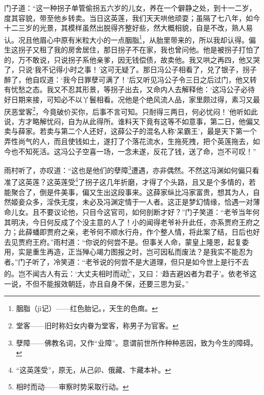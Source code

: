 \par 门子道：“这一种拐子单管偷拐五六岁的儿女，养在一个僻静之处，到十一二岁，度其容貌，带至他乡转卖。当日这英莲，我们天天哄他顽耍；虽隔了七八年，如今十二三岁的光景，其模样虽然出脱得齐整好些，然大概相貌，自是不改，熟人易认。况且他眉心中原有米粒大小的一点胭脂\footnote{胭脂（jì记）——红色胎记。，天生的色癍。}，从胎里带来的，所以我却认得。偏生这拐子又租了我的房舍居住，那日拐子不在家，我也曾问他。他是被拐子打怕了的，万不敢说，只说拐子系他亲爹，因无钱偿债，故卖他。我又哄之再四，他又哭了，只说‘我不记得小时之事！’这可无疑了。那日冯公子相看了，兑了银子，拐子醉了，他自叹道：‘我今日罪孽可满了！’后又听见冯公子令三日之后过门，他又转有忧愁之态。我又不忍其形景，等拐子出去，又命内人去解释他：‘这冯公子必待好日期来接，可知必不以丫鬟相看。况他是个绝风流人品，家里颇过得，素习又最厌恶堂客\footnote{堂客——旧时称妇女内眷为堂客，称男子为官客。}，今竟破价买你，后事不言可知。只耐得三两日，何必忧闷！’他听如此说，方才略解忧闷，自为从此得所。谁料天下竟有这等不如意事，第二日，他偏又卖与薛家。若卖与第二个人还好，这薛公子的混名人称‘呆霸王’，最是天下第一个弄性尚气的人，而且使钱如土，遂打了个落花流水，生拖死拽，把个英莲拖去，如今也不知死活。这冯公子空喜一场，一念未遂，反花了钱，送了命，岂不可叹！”
\par 雨村听了，亦叹道：“这也是他们的孽障\footnote{孽障——佛教名词，又作“业障”。意谓前世所作种种恶因，致为今生的障碍。}遭遇，亦非偶然。不然这冯渊如何偏只看准了这英莲？这英莲受\footnote{“这英莲受”，原无，从己卯、俄藏、卞藏本补。}了拐子这几年折磨，才得了个头路，且又是个多情的，若能聚合了，倒是件美事，偏又生出这段事来。这薛家纵比冯家富贵，想其为人，自然姬妾众多，淫佚无度，未必及冯渊定情于一人者。这正是梦幻情缘，恰遇一对薄命儿女。且不要议论他，只目今这官司，如何剖断才好？”门子笑道：“老爷当年何其明决，今日何反成了个没主意的人了！小的闻得老爷补升此任，亦系贾府王府之力；此薛蟠即贾府之亲，老爷何不顺水行舟，作个整人情，将此案了结，日后也好去见贾府王府。”雨村道：“你说的何尝不是。但事关人命，蒙皇上隆恩，起复委用，实是重生再造，正当殚心竭力图报之时，岂可因私而废法？是我实不能忍为者。”门子听了，冷笑道：“老爷说的何尝不是大道理，但只是如今世上是行不去的。岂不闻古人有云：‘大丈夫相时而动\footnote{相时而动——审察时势采取行动。}’，又曰：‘趋吉避凶者为君子’。依老爷这一说，不但不能报效朝廷，亦且自身不保，还要三思为妥。”
